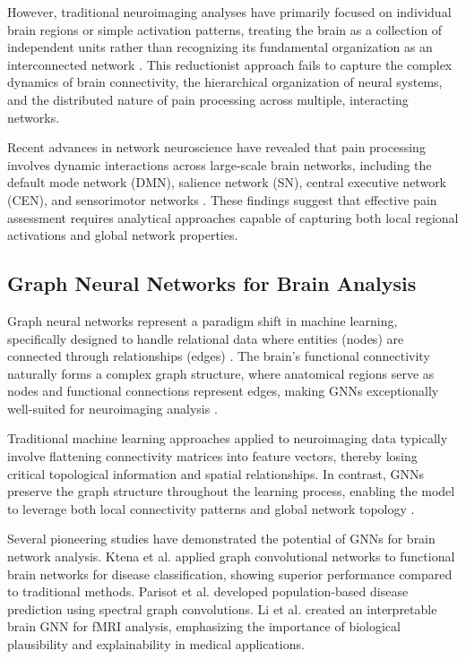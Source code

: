 \documentclass[10pt,journal,compsoc]{IEEEtran}
\begin{document}
However, traditional neuroimaging analyses have primarily focused on individual brain regions or simple activation patterns, treating the brain as a collection of independent units rather than recognizing its fundamental organization as an interconnected network \cite{power2011functional,sporns2005human}. This reductionist approach fails to capture the complex dynamics of brain connectivity, the hierarchical organization of neural systems, and the distributed nature of pain processing across multiple, interacting networks.

Recent advances in network neuroscience have revealed that pain processing involves dynamic interactions across large-scale brain networks, including the default mode network (DMN), salience network (SN), central executive network (CEN), and sensorimotor networks \cite{bassett2011human}. These findings suggest that effective pain assessment requires analytical approaches capable of capturing both local regional activations and global network properties.

\subsection{Graph Neural Networks for Brain Analysis}

Graph neural networks represent a paradigm shift in machine learning, specifically designed to handle relational data where entities (nodes) are connected through relationships (edges) \cite{kipf2016semi,wu2020comprehensive}. The brain's functional connectivity naturally forms a complex graph structure, where anatomical regions serve as nodes and functional connections represent edges, making GNNs exceptionally well-suited for neuroimaging analysis \cite{zhou2020graph}.

Traditional machine learning approaches applied to neuroimaging data typically involve flattening connectivity matrices into feature vectors, thereby losing critical topological information and spatial relationships. In contrast, GNNs preserve the graph structure throughout the learning process, enabling the model to leverage both local connectivity patterns and global network topology \cite{hamilton2017inductive,veličković2017graph}.

Several pioneering studies have demonstrated the potential of GNNs for brain network analysis. Ktena et al. \cite{ktena2018distance} applied graph convolutional networks to functional brain networks for disease classification, showing superior performance compared to traditional methods. Parisot et al. \cite{parisot2018spectral} developed population-based disease prediction using spectral graph convolutions. Li et al. \cite{li2021braingnn} created an interpretable brain GNN for fMRI analysis, emphasizing the importance of biological plausibility and explainability in medical applications.
\end{document}
